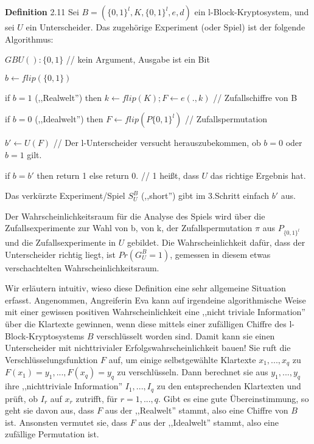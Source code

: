 \documentclass[a4paper]{article}
\begin{document}
\begin{multicols}{3}
    \textbf{Definition} 2.11 Sei $B=(\{0,1\}^l,K,\{0,1\}^l,e,d)$ ein l-Block-Kryptosystem, und sei $U$ ein Unterscheider. Das zugehörige Experiment (oder Spiel) ist der folgende Algorithmus:
    \begin{itemize*}
        \item $GBU():\{0,1\}$ // kein Argument, Ausgabe ist ein Bit
        \begin{enumerate*}
            \item $b\leftarrow flip(\{0,1\})$
            \begin{itemize*}
                \item if $b=1$ (,,Realwelt'') then $k\leftarrow flip(K);F\leftarrow e(.,k)$ // Zufallschiffre von B
                \item if $b=0$ (,,Idealwelt'') then $F\leftarrow flip(P\{0,1\}^l)$ // Zufallspermutation
            \end{itemize*}
            \item $b'\leftarrow U(F)$ // Der l-Unterscheider versucht herauszubekommen, ob $b=0$ oder $b=1$ gilt.
            \item if $b=b'$ then return 1 else return 0.   // 1 heißt, dass $U$ das richtige Ergebnis hat.
        \end{enumerate*}
    \end{itemize*}

    Das verkürzte Experiment/Spiel $S^B_U$ (,,short'') gibt im 3.Schritt einfach $b'$ aus.

    Der Wahrscheinlichkeitsraum für die Analyse des Spiels wird über die Zufallsexperimente zur Wahl von b, von k, der Zufallspermutation $\pi$ aus $P_{\{0,1\}^l}$ und die Zufallsexperimente in $U$ gebildet. Die Wahrscheinlichkeit dafür, dass der Unterscheider richtig liegt, ist $Pr(G^B_U=1)$, gemessen in diesem etwas verschachtelten Wahrscheinlichkeitsraum.

    Wir erläutern intuitiv, wieso diese Definition eine sehr allgemeine Situation erfasst. Angenommen, Angreiferin Eva kann auf irgendeine algorithmische Weise mit einer gewissen positiven Wahrscheinlichkeit eine ,,nicht triviale Information'' über die Klartexte gewinnen, wenn diese mittels einer zufälligen Chiffre des l-Block-Kryptosystems $B$ verschlüsselt worden sind. Damit kann sie einen Unterscheider mit nichttrivialer Erfolgswahrscheinlichkeit bauen! Sie ruft die Verschlüsselungsfunktion $F$ auf, um einige selbstgewählte Klartexte $x_1,...,x_q$ zu $F(x_1)=y_1,...,F(x_q)=y_q$ zu verschlüsseln. Dann berechnet sie aus $y_1,...,y_q$ ihre ,,nichttriviale Information'' $I_1,...,I_q$ zu den entsprechenden Klartexten und prüft, ob $I_r$ auf $x_r$ zutrifft, für $r=1,...,q$. Gibt es eine gute Übereinstimmung, so geht sie davon aus, dass $F$ aus der ,,Realwelt'' stammt, also eine Chiffre von $B$ ist. Ansonsten vermutet sie, dass $F$ aus der ,,Idealwelt'' stammt, also eine zufällige Permutation ist.


\end{multicols}
\end{document}
